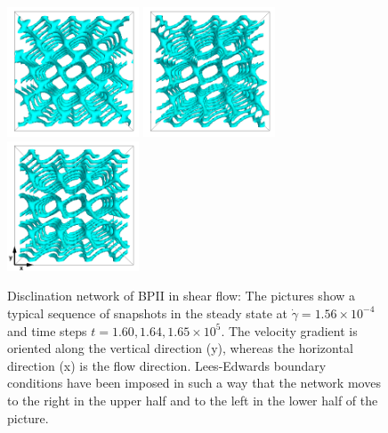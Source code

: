\documentclass[8.5pt,twoside,twocolumn]{article}
\newcommand{\e}[1]{\times10^{#1}}
\newcommand{\gd}{\dot{\gamma}}
\begin{document}
\begin{figure}[htpb]
\center
\includegraphics[width=0.35\textwidth]{disc-160k_run902.png}
\includegraphics[width=0.35\textwidth]{disc-164k_run902.png}
\includegraphics[width=0.35\textwidth]{disc-165k_run902.png}
\caption{Disclination network of BPII in shear flow: 
The pictures show a typical sequence of snapshots in the steady state 
at $\gd=1.56\e{-4}$ and time steps $t=1.60, 1.64,1.65\e{5}$. The velocity 
gradient is oriented along the vertical direction (y), whereas the 
horizontal direction (x) is the flow direction. Lees-Edwards boundary 
conditions have been imposed in such a way that the network moves to the 
right in the upper half and to the left in the lower half of the picture.}
\label{bp2-med}
\end{figure}
\end{document}
